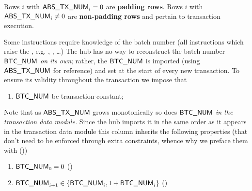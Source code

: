 Rows $i$ with $\textsf{ABS\_TX\_NUM}_{i} = 0$ are \textbf{padding rows}. Rows $i$ with $\textsf{ABS\_TX\_NUM}_{i} \neq 0$ are \textbf{non-padding rows} and pertain to transaction execution.

Some instructions require knowledge of the batch number (all instructions which raise the \btcFlag{}, e.g. , , \dots{}) The hub has no way to reconstruct the batch number $\textsf{BTC\_NUM}$ \emph{on its own}; rather, the $\textsf{BTC\_NUM}$ is imported (using $\textsf{ABS\_TX\_NUM}$ for reference) and set at the start of every new transaction. To ensure its validity throughout the transaction we impose that
\begin{enumerate}[resume]
	\item $\textsf{BTC\_NUM}$ be transaction-constant;
\end{enumerate}
Note that as $\textsf{ABS\_TX\_NUM}$ grows monotonically so does $\textsf{BTC\_NUM}$ \emph{in the transaction data module.} Since the hub imports it in the same order as it appears in the transaction data module this column inherits the following properties (that don't need to be enforced through extra constraints, whence why we preface them with (\trash))
\begin{enumerate}[resume]
	\item $\textsf{BTC\_NUM}_{0} = 0$                                            \quad (\trash)
	\item $\textsf{BTC\_NUM}_{i + 1} \in \{ \textsf{BTC\_NUM}_{i}, 1 + \textsf{BTC\_NUM}_{i} \}$ \quad (\trash)
\end{enumerate}
